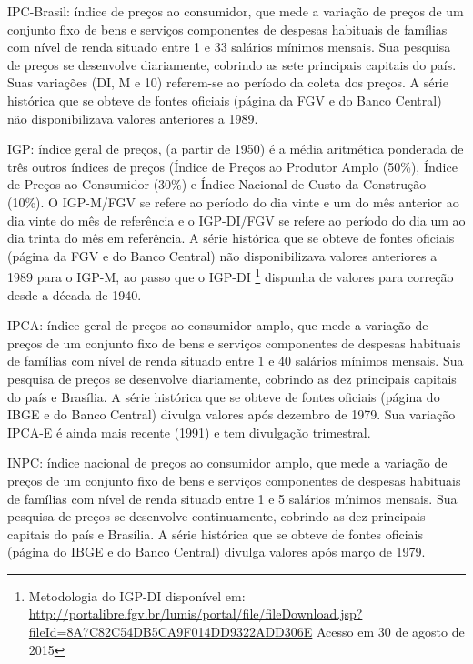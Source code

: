 \begin{compactitem}
\item IPC-Brasil: índice de preços ao consumidor, que mede a variação de preços de um conjunto fixo de bens e serviços componentes de despesas habituais de famílias com nível de renda situado entre 1 e 33 salários mínimos mensais. Sua pesquisa de preços se desenvolve diariamente, cobrindo as sete principais capitais do país. Suas variações (DI, M e 10) referem-se ao período da coleta dos preços. A série histórica que se obteve de fontes oficiais (página da FGV e do Banco Central) não disponibilizava valores anteriores a 1989.

\item IGP: índice geral de preços, (a partir de 1950) é a média aritmética ponderada de três outros índices de preços (Índice de Preços ao Produtor Amplo (50\%), Índice de Preços ao Consumidor (30\%) e Índice Nacional de Custo da Construção (10\%). O IGP-M/FGV se refere ao período do dia vinte e um do mês anterior ao dia vinte do mês de referência e o IGP-DI/FGV se refere ao período do dia um ao dia trinta do mês em referência. A série histórica que se obteve de fontes oficiais (página da FGV e do Banco Central) não disponibilizava valores anteriores a 1989 para o IGP-M, ao passo que o IGP-DI
\footnote{Metodologia do IGP-DI disponível em: \url{http://portalibre.fgv.br/lumis/portal/file/fileDownload.jsp?fileId=8A7C82C54DB5CA9F014DD9322ADD306E} Acesso em 30 de agosto de 2015} dispunha de valores para correção desde a década de 1940.

\item IPCA: índice geral de preços ao consumidor amplo, que mede a variação de preços de um conjunto fixo de bens e serviços componentes de despesas habituais de famílias com nível de renda situado entre 1 e 40 salários mínimos mensais. Sua pesquisa de preços se desenvolve diariamente, cobrindo as dez principais capitais do país e Brasília. A série histórica que se obteve de fontes oficiais (página do IBGE e do Banco Central) divulga valores após dezembro de 1979. Sua variação IPCA-E é ainda mais recente (1991) e tem divulgação trimestral.

\item INPC: índice nacional de preços ao consumidor amplo, que mede a variação de preços de um conjunto fixo de bens e serviços componentes de despesas habituais de famílias com nível de renda situado entre 1 e 5 salários mínimos mensais. Sua pesquisa de preços se desenvolve continuamente, cobrindo as dez principais capitais do país e Brasília. A série histórica que se obteve de fontes oficiais (página do IBGE e do Banco Central) divulga valores após março de 1979.
\end{compactitem}

